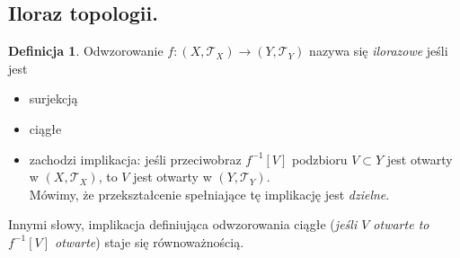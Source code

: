\documentclass{article}
\theoremstyle{definition}%
\newtheorem{defn}{Definicja}
\theoremstyle{theorem}
\newcommand{\sT}{\mathcal{T}} %
\begin{document}
	\subsection{Iloraz topologii.}
	\begin{defn}
		Odwzorowanie $f:(X,\sT_X) \to (Y,\sT_Y)$ nazywa się \emph{ilorazowe} jeśli jest
		\begin{itemize}
			\item surjekcją
			\item ciągłe
			\item zachodzi implikacja: jeśli przeciwobraz $f^{-1}[V]$ podzbioru $V\subset Y$ jest otwarty w $(X,\sT_X)$, to $V$ jest otwarty w $(Y,\sT_Y)$.\\
			Mówimy, że przekształcenie spełniające tę implikację jest \emph{dzielne}.
		\end{itemize}
		Innymi słowy, implikacja definiująca odwzorowania ciągłe (\emph{jeśli $V$ otwarte to $f^{-1}[V]$ otwarte}) staje się równoważnością.
	\end{defn}
	
\end{document}
